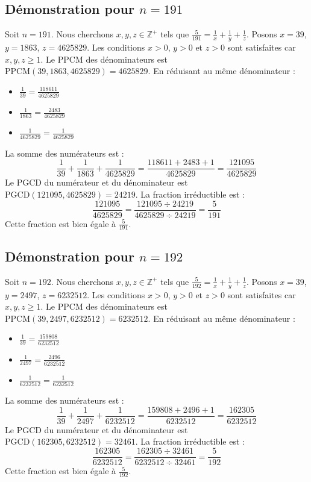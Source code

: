 \documentclass[11pt,a4paper]{article}
\begin{document}
\subsection{Démonstration pour $n = 191$}
Soit $n = 191$. Nous cherchons $x, y, z \in \mathbb{Z}^{+}$ tels que $\frac{5}{191} = \frac{1}{x} + \frac{1}{y} + \frac{1}{z}$.
Posons $x = 39$, $y = 1863$, $z = 4625829$.
Les conditions $x > 0$, $y > 0$ et $z > 0$ sont satisfaites car $x, y, z \geq 1$.
Le PPCM des dénominateurs est $\text{PPCM}(39, 1863, 4625829) = 4625829$.
En réduisant au même dénominateur :
\begin{itemize}
    \item $\frac{1}{39} = \frac{118611}{4625829}$
    \item $\frac{1}{1863} = \frac{2483}{4625829}$
    \item $\frac{1}{4625829} = \frac{1}{4625829}$
\end{itemize}
La somme des numérateurs est :
$$ \frac{1}{39} + \frac{1}{1863} + \frac{1}{4625829} = \frac{118611 + 2483 + 1}{4625829} = \frac{121095}{4625829} $$
Le PGCD du numérateur et du dénominateur est $\text{PGCD}(121095, 4625829) = 24219$.
La fraction irréductible est :
$$ \frac{121095}{4625829} = \frac{121095 \div 24219}{4625829 \div 24219} = \frac{5}{191} $$
Cette fraction est bien égale à $\frac{5}{191}$.

\subsection{Démonstration pour $n = 192$}
Soit $n = 192$. Nous cherchons $x, y, z \in \mathbb{Z}^{+}$ tels que $\frac{5}{192} = \frac{1}{x} + \frac{1}{y} + \frac{1}{z}$.
Posons $x = 39$, $y = 2497$, $z = 6232512$.
Les conditions $x > 0$, $y > 0$ et $z > 0$ sont satisfaites car $x, y, z \geq 1$.
Le PPCM des dénominateurs est $\text{PPCM}(39, 2497, 6232512) = 6232512$.
En réduisant au même dénominateur :
\begin{itemize}
    \item $\frac{1}{39} = \frac{159808}{6232512}$
    \item $\frac{1}{2497} = \frac{2496}{6232512}$
    \item $\frac{1}{6232512} = \frac{1}{6232512}$
\end{itemize}
La somme des numérateurs est :
$$ \frac{1}{39} + \frac{1}{2497} + \frac{1}{6232512} = \frac{159808 + 2496 + 1}{6232512} = \frac{162305}{6232512} $$
Le PGCD du numérateur et du dénominateur est $\text{PGCD}(162305, 6232512) = 32461$.
La fraction irréductible est :
$$ \frac{162305}{6232512} = \frac{162305 \div 32461}{6232512 \div 32461} = \frac{5}{192} $$
Cette fraction est bien égale à $\frac{5}{192}$.
\end{document}

